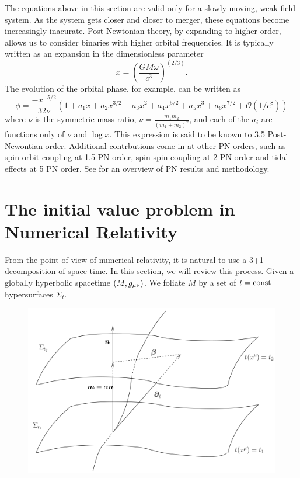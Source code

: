 The equations above in this section are valid only for a slowly-moving, weak-field system. As the system gets closer and closer to merger, these equations become increasingly inacurate. Post-Newtonian theory, by expanding to higher order, allows us to consider binaries with higher orbital frequencies. It is typically written as an expansion in the dimensionless parameter 
\begin{equation}
x=\left(\frac{GM\omega}{c^3}\right)^{(2/3)}.
\end{equation}
The evolution of the orbital phase, for example, can be written as
\begin{equation}
\phi=\frac{-x^{-5/2}}{32\nu}\left(1+a_1x + a_2x^{3/2} + a_3x^2 + a_4x^{5/2} + a_5x^3 + a_6x^{7/2}+\mathcal{O}(1/c^8)\right)
\end{equation}
where $\nu$ is the symmetric mass ratio, $\nu=\frac{m_1m_2}{(m_1+m_2)^2}$, and each of the $a_i$ are functions only of $\nu$ and $\log{x}$. This expression is said to be known to 3.5 Post-Newontian order. Additional contrbutions come in at other PN orders, such as spin-orbit coupling at 1.5 PN order, spin-spin coupling at 2 PN order and tidal effects at 5 PN order. See  for an overview of PN results and methodology.


\section{The initial value problem in Numerical Relativity}
\label{sec:IVP}
From the point of view of numerical relativity, it is natural to use a 3+1 decomposition of space-time. In this section, we will review this process. Given a globally hyperbolic spacetime $(M,g_{\mu\nu})$. We foliate $M$ by a set of $t={\rm const}$ hypersurfaces $\Sigma_t$.
\begin{center}
\begin{figure}[!ht]
\includegraphics[scale=0.45]{intro/Slice.png}
\label{fig_Slice}
\caption[]{}
\end{figure}
\end{center}

